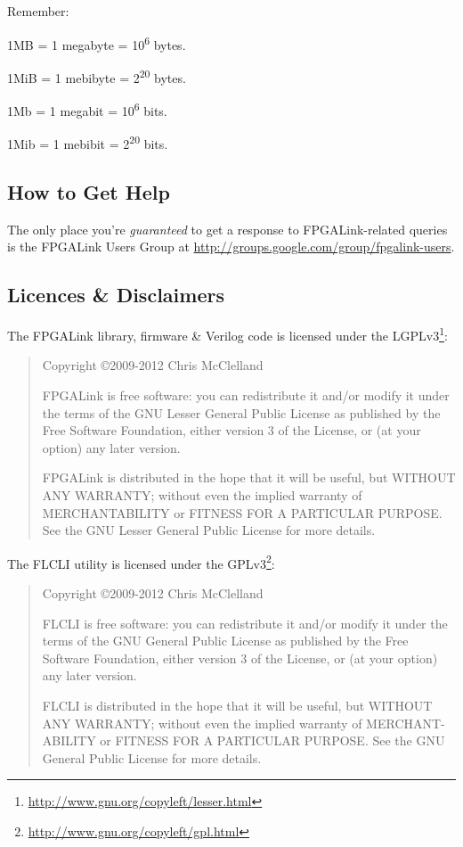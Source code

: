 Remember:

\begin{blobs}
  \item 1MB = 1 megabyte = 10\textsuperscript{6} bytes.
  \item 1MiB = 1 mebibyte = 2\textsuperscript{20} bytes.
  \item 1Mb = 1 megabit = 10\textsuperscript{6} bits.
  \item 1Mib = 1 mebibit = 2\textsuperscript{20} bits.
\end{blobs}

\subsection{How to Get Help}
The only place you're \textit{guaranteed} to get a response to FPGALink-related queries is the FPGALink Users Group at \url{http://groups.google.com/group/fpgalink-users}.

\newpage
\subsection{Licences \& Disclaimers}
The FPGALink library, firmware \& Verilog code is licensed under the LGPLv3\footnote{\url{http://www.gnu.org/copyleft/lesser.html}}:

\begin{quote}
Copyright \copyright 2009-2012 Chris McClelland

FPGALink is free software: you can redistribute it and/or modify it under the terms of the GNU Lesser General Public License as published by the Free Software Foundation, either version 3 of the License, or (at your option) any later version.

FPGALink is distributed in the hope that it will be useful, but WITHOUT ANY WARRANTY; without even the implied warranty of MERCHANTABILITY or FITNESS FOR A PARTICULAR PURPOSE. See the GNU Lesser General Public License for more details.
\end{quote}

The FLCLI utility is licensed under the GPLv3\footnote{\url{http://www.gnu.org/copyleft/gpl.html}}:

\begin{quote}
Copyright \copyright 2009-2012 Chris McClelland

FLCLI is free software: you can redistribute it and/or modify it under the terms of the GNU General Public License as published by the Free Software Foundation, either version 3 of the License, or (at your option) any later version.

FLCLI is distributed in the hope that it will be useful, but WITHOUT ANY WARRANTY; without even the implied warranty of MERCHANT-ABILITY or FITNESS FOR A PARTICULAR PURPOSE. See the GNU General Public License for more details.
\end{quote}

